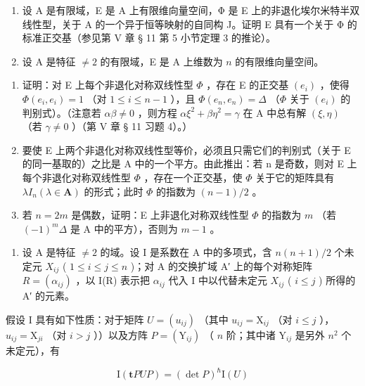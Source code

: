 \begin{enumerate}
\def\labelenumi{\arabic{enumi})}
\setcounter{enumi}{2}
\item
  设 A 是有限域，E 是 A 上有限维向量空间，Φ 是 E 上的非退化埃尔米特半双线性型，关于 A 的一个异于恒等映射的自同构 J。证明 E 具有一个关于 Φ 的标准正交基（参见第 V 章 § 11 第 5 小节定理 3 的推论）。
\item
  设 A 是特征 \(\neq 2\) 的有限域，E 是 A 上维数为 \(n\) 的有限维向量空间。
\end{enumerate}

\begin{enumerate}
\def\labelenumi{\alph{enumi})}
\item
  证明：对 E 上每个非退化对称双线性型 \(\Phi\) ，存在 E 的正交基 \((e_i)\) ，使得 \(\Phi(e_i, e_i) = 1\) （对 \(1 \leqslant i \leqslant n - 1\) ），且 \(\Phi(e_n, e_n) = \Delta\) （\(\Phi\) 关于 \((e_i)\) 的判别式）。（注意若 \(\alpha\beta \neq 0\) ，则方程 \(\alpha\xi^2 + \beta\eta^2 = \gamma\) 在 A 中总有解 \((\xi, \eta)\) （若 \(\gamma \neq 0\) ）（第 V 章 § 11 习题 4）。）
\item
  要使 E 上两个非退化对称双线性型等价，必须且只需它们的判别式（关于 E 的同一基取的）之比是 A 中的一个平方。由此推出：若 n 是奇数，则对 E 上每个非退化对称双线性型 \(\Phi\) ，存在一个正交基，使 \(\Phi\) 关于它的矩阵具有 \(\lambda I_{n} (\lambda \in \mathbf{A})\) 的形式；此时 \(\Phi\) 的指数为 \((n - 1)/2\) 。
\item
  若 \(n=2m\) 是偶数，证明：E 上非退化对称双线性型 \(\Phi\) 的指数为 \(m\) （若 \((-1)^{m}\Delta\) 是 A 中的平方），否则为 \(m-1\) 。
\end{enumerate}

\begin{enumerate}
\def\labelenumi{\arabic{enumi})}
\setcounter{enumi}{4}
\tightlist
\item
  设 A 是特征 \(\neq 2\) 的域。设 I 是系数在 A 中的多项式，含 \(n(n+1)/2\) 个未定元 \(X_{ij}\) ( \(1 \leqslant i \leqslant j \leqslant n\) )；对 A 的交换扩域 A′ 上的每个对称矩阵 \(R = (\alpha_{ij})\) ，以 I(R) 表示把 \(\alpha_{ij}\) 代入 I 中以代替未定元 \(X_{ij}\) ( \(i \leqslant j\) ) 所得的 A′ 的元素。
\end{enumerate}

假设 I 具有如下性质：对于矩阵 \(U = (u_{ij})\) （其中 \(u_{ij} = \mathrm{X}_{ij}\) （对 \(i \leqslant j\) ），\(u_{ij} = \mathrm{X}_{ji}\) （对 \(i > j\) ））以及方阵 \(P = (\mathrm{Y}_{ij})\) （ \(n\) 阶；其中诸 \(\mathrm{Y}_{ij}\) 是另外 \(n^2\) 个未定元），有

\[
\mathrm{I} (\mathbf {t} P U P) = (\det P) ^ {\hbar} \mathrm{I} (U)
\]

